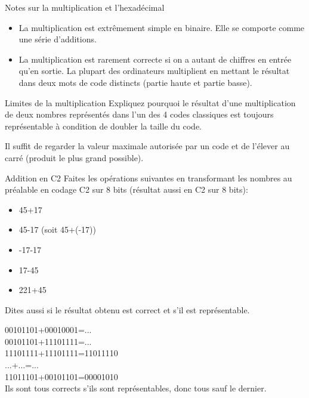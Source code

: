 \begin{frame}{Notes sur la multiplication et l'hexadécimal}
  \begin{itemize}
  \item La multiplication est extrêmement simple en binaire. Elle se comporte comme une série d'additions.
  \item La multiplication est rarement correcte si on a autant de
    chiffres en entrée qu'en sortie. La plupart des ordinateurs
    multiplient en mettant le résultat dans deux mots de code distincts
    (partie haute et partie basse).
  \end{itemize}
\end{frame}
\begin{exercice}
  \begin{exercicelet}{Limites de la multiplication}
    Expliquez pourquoi le résultat d'une multiplication de deux nombres
    représentés dans l'un des 4 codes classiques est toujours
    représentable à condition de doubler la taille du code.
    \begin{xcorrection}
      Il suffit de regarder la valeur maximale autorisée par un code et
      de l'élever au carré (produit le plus grand possible).
    \end{xcorrection}
  \end{exercicelet}
  \begin{exercicelet}{Addition en C2}
    Faites les opérations suivantes en transformant les nombres au
    préalable en codage C2 sur 8 bits (résultat aussi en C2 sur 8 bits):
    \begin{itemize}
    \item 45+17
    \item 45-17 (soit 45+(-17))
    \item -17-17
    \item 17-45
    \item 221+45
    \end{itemize}
    Dites aussi si le résultat obtenu est correct et s'il est représentable.
    \begin{xcorrection}
      00101101+00010001=...\\
      00101101+11101111=...\\
      11101111+11101111=11011110\\
      ...+...=...\\ %
      11011101+00101101=00001010\\
      Ils sont tous corrects s'ils sont représentables, donc tous sauf le dernier.
    \end{xcorrection}
  \end{exercicelet}
\end{exercice}
